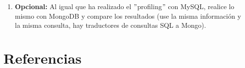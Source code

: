\documentclass[paper=a4, fontsize=11pt]{scrartcl} %
\numberwithin{equation}{section} %
\numberwithin{figure}{section} %
\numberwithin{table}{section} %
\begin{document}
\begin{enumerate}
		Sobre la base de datos por defecto \textit{mysql}, he realizado la consulta:
		\begin{verbatim}
			select password from user where user.user in (select user from proxies\_priv where
			with\_grant$>$0 \&\& host like '\%oxcar103\%');
		\end{verbatim}
		
		Después, he creado un índice sobre la tabla \textit{proxies\_priv} para agilizar la consulta.
		
		Y podemos ver el resultado en la siguiente captura del proceso\footnote{He emborronado la salida
		de la consulta porque no es de interés para la práctica y son contraseñas, aunque cifradas.}:
		
		\begin{figure}[H]
			\centering
			\texttt{[image: Ejercicio\_19.jpg]}
			\caption{Experimento con el \textit{profile} de \textit{mysql}.}
			\label{fig:profile}	
		\end{figure}
		
	\subsubsection{MongoDB}
		\item \textbf{Opcional:} Al igual que ha realizado el $"$profiling$"$ con MySQL, realice lo
		mismo con MongoDB y compare los resultados (use la misma información y la misma consulta, hay
		traductores de consultas SQL a Mongo).
		
\end{enumerate}

\newpage
\section{Referencias}

\end{document}
